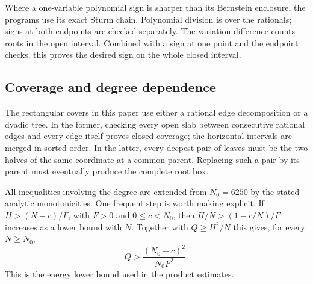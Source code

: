 \documentclass[11pt,reqno]{amsart}
\numberwithin{equation}{section}
\theoremstyle{definition}
\theoremstyle{remark}
\begin{document}
Where a one-variable polynomial sign is sharper than its
Bernstein enclosure, the programs use its exact Sturm chain.
Polynomial division is over the rationals; signs at both
endpoints are checked separately. The variation difference
counts roots in the open interval. Combined with a sign at
one point and the endpoint checks, this proves the desired
sign on the whole closed interval.

\subsection{Coverage and degree dependence}

The rectangular covers in this paper use either a rational
edge decomposition or a dyadic tree. In the former, checking
every open slab between consecutive rational edges and every
edge itself proves closed coverage; the horizontal intervals
are merged in sorted order. In the latter, every deepest
pair of leaves must be the two halves of the same coordinate
at a common parent. Replacing such a pair by its parent
must eventually produce the complete root box.

All inequalities involving the degree are extended from
$N_0=6250$ by the stated analytic monotonicities. One
frequent step is worth making explicit. If
$H>(N-c)/F$, with $F>0$ and $0\le c<N_0$, then
$H/N>(1-c/N)/F$ increases as a lower bound with $N$.
Together with $Q\ge H^2/N$ this gives, for every $N\ge N_0$,
\[
 Q>\frac{(N_0-c)^2}{N_0F^2}.
\]
This is the energy lower bound used in the product estimates.
\end{document}

